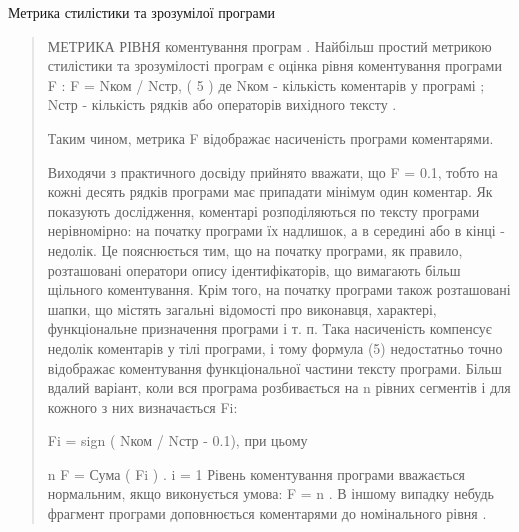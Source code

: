 Метрика стилістики та зрозумілої програми
\begin{quote}

МЕТРИКА РІВНЯ коментування програм .
Найбільш простий метрикою стилістики та зрозумілості програм є оцінка рівня коментування програми F :
F = Nком / Nстр, ( 5 )
де Nком - кількість коментарів у програмі ; Nстр - кількість рядків або операторів вихідного тексту .

Таким чином, метрика F відображає насиченість програми коментарями.

Виходячи з практичного досвіду прийнято вважати, що F = 0.1, тобто на кожні десять рядків програми має припадати мінімум один коментар. Як показують дослідження, коментарі розподіляються по тексту програми нерівномірно: на початку програми їх надлишок, а в середині або в кінці - недолік. Це пояснюється тим, що на початку програми, як правило, розташовані оператори опису ідентифікаторів, що вимагають більш щільного коментування. Крім того, на початку програми також розташовані шапки, що містять загальні відомості про виконавця, характері, функціональне призначення програми і т. п. Така насиченість компенсує недолік коментарів у тілі програми, і тому формула (5) недостатньо точно відображає коментування функціональної частини тексту програми.
Більш вдалий варіант, коли вся програма розбивається на n рівних сегментів і для кожного з них визначається Fi:

Fi = sign ( Nком / Nстр - 0.1),
при цьому

n
F = Сума ( Fi ) .
i = 1
Рівень коментування програми вважається нормальним, якщо виконується умова: F = n . В іншому випадку небудь фрагмент програми доповнюється коментарями до номінального рівня .
\end{quote}
